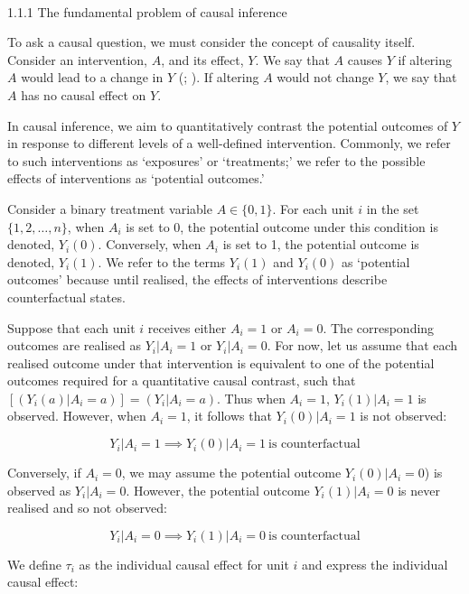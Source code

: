 \documentclass[
  single column]{article}
\makeatletter
\let\oldparagraph\paragraph
\renewcommand{\paragraph}{
    \@ifstar
      \xxxParagraphStar
      \xxxParagraphNoStar
  }
\newcommand{\xxxParagraphStar}[1]{\oldparagraph*{#1}\mbox{}}
\newcommand{\xxxParagraphNoStar}[1]{\oldparagraph{#1}\mbox{}}
\makeatother
\begin{document}
\paragraph{1.1.1 The fundamental problem of causal
inference}\label{the-fundamental-problem-of-causal-inference}

To ask a causal question, we must consider the concept of causality
itself. Consider an intervention, \(A\), and its effect, \(Y\). We say
that \(A\) causes \(Y\) if altering \(A\) would lead to a change in
\(Y\) (;
). If altering \(A\) would not
change \(Y\), we say that \(A\) has no causal effect on \(Y\).

In causal inference, we aim to quantitatively contrast the potential
outcomes of \(Y\) in response to different levels of a well-defined
intervention. Commonly, we refer to such interventions as `exposures' or
`treatments;' we refer to the possible effects of interventions as
`potential outcomes.'

Consider a binary treatment variable \(A \in \{0,1\}\). For each unit
\(i\) in the set \(\{1, 2, \ldots, n\}\), when \(A_i\) is set to 0, the
potential outcome under this condition is denoted, \(Y_i(0)\).
Conversely, when \(A_i\) is set to 1, the potential outcome is denoted,
\(Y_i(1)\). We refer to the terms \(Y_i(1)\) and \(Y_i(0)\) as
`potential outcomes' because until realised, the effects of
interventions describe counterfactual states.

Suppose that each unit \(i\) receives either \(A_i = 1\) or \(A_i = 0\).
The corresponding outcomes are realised as \(Y_i|A_i = 1\) or
\(Y_i|A_i = 0\). For now, let us assume that each realised outcome under
that intervention is equivalent to one of the potential outcomes
required for a quantitative causal contrast, such that
\([(Y_i(a)|A_i = a)] = (Y_i|A_i = a)\). Thus when \(A_i = 1\),
\(Y_i(1)|A_i = 1\) is observed. However, when \(A_i = 1\), it follows
that \(Y_i(0)|A_i = 1\) is not observed:

\[
Y_i|A_i = 1 \implies Y_i(0)|A_i = 1~ \text{is counterfactual}
\]

Conversely, if \(A_i = 0\), we may assume the potential outcome
\(Y_i(0)|A_i = 0\)) is observed as \(Y_i|A_i = 0\). However, the
potential outcome \(Y_i(1)|A_i = 0\) is never realised and so not
observed:

\[
Y_i|A_i = 0 \implies Y_i(1)|A_i = 0~ \text{is counterfactual}
\]

We define \(\tau_i\) as the individual causal effect for unit \(i\) and
express the individual causal effect:
\end{document}
